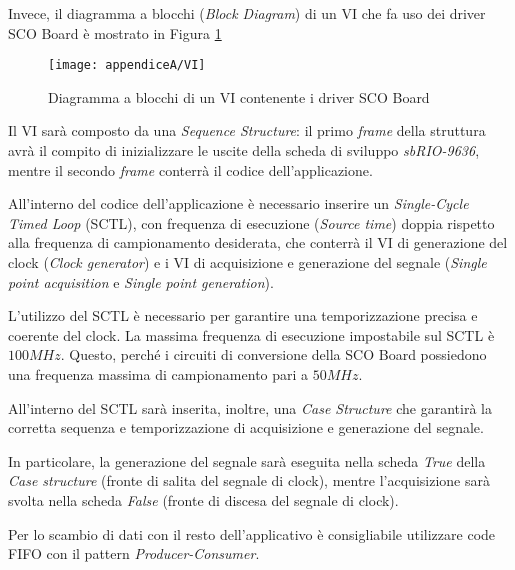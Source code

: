 Invece, il diagramma a blocchi (\textit{Block Diagram}) di un VI che fa uso dei driver SCO Board è mostrato in Figura \ref{VI}

\begin{figure}[H]
	\begin{center}
		\texttt{[image: appendiceA/VI]}
		\caption{Diagramma a blocchi di un VI contenente i driver SCO Board}
		\label{VI}
	\end{center}
\end{figure}

Il VI sarà composto da una \textit{Sequence Structure}: il primo \textit{frame} della struttura avrà il compito di inizializzare le uscite della scheda di sviluppo \textit{sbRIO-9636}, mentre il secondo \textit{frame} conterrà il codice dell'applicazione.

All'interno del codice dell'applicazione è necessario inserire un \textit{Single-Cycle Timed Loop} (SCTL), con frequenza di esecuzione (\textit{Source time}) doppia rispetto alla frequenza di campionamento desiderata, che conterrà il VI di generazione del clock (\textit{Clock generator}) e i VI di acquisizione e generazione del segnale (\textit{Single point acquisition} e \textit{Single point generation}). 

L'utilizzo del SCTL è necessario per garantire una temporizzazione precisa e coerente del clock. La massima frequenza di esecuzione impostabile sul SCTL è $100MHz$. Questo, perché i circuiti di conversione della SCO Board possiedono una frequenza massima di campionamento pari a $50MHz$.

All'interno del SCTL sarà inserita, inoltre, una \textit{Case Structure} che garantirà la corretta sequenza e temporizzazione di acquisizione e generazione del segnale. 

In particolare, la generazione del segnale sarà eseguita nella scheda \textit{True} della \textit{Case structure} (fronte di salita del segnale di clock), mentre l'acquisizione sarà svolta nella scheda \textit{False} (fronte di discesa del segnale di clock).

Per lo scambio di dati con il resto dell'applicativo è consigliabile utilizzare code FIFO con il pattern \textit{Producer-Consumer}.